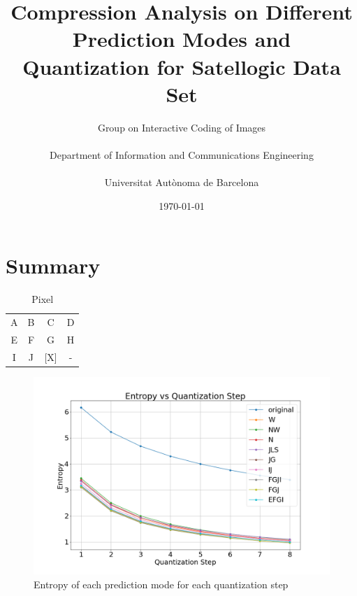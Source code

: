 \documentclass{article}
\title{Compression Analysis on Different Prediction Modes and Quantization for Satellogic Data Set}
\author{Group on Interactive Coding of Images\\ \\
Department of Information and Communications Engineering\\ \\
Universitat Autònoma de Barcelona}
\date{\today}
\begin{document}
\maketitle
\tableofcontents
\section{Summary}

\begin{table}[h!]
    \caption{Pixel}
    \centering
    \begin{tabular}{ c c c c }
     A & B & C & D \\
     E & F & G & H \\
     I & J & [X] & -
    \end{tabular}
\end{table}
\begin{figure}[h!]
    \centering
    \includegraphics[width=0.7\linewidth]{figures/entropies.png}
    \caption{Entropy of each prediction mode for each quantization step}
    \label{fig:bpppc}
\end{figure}
\end{document}
